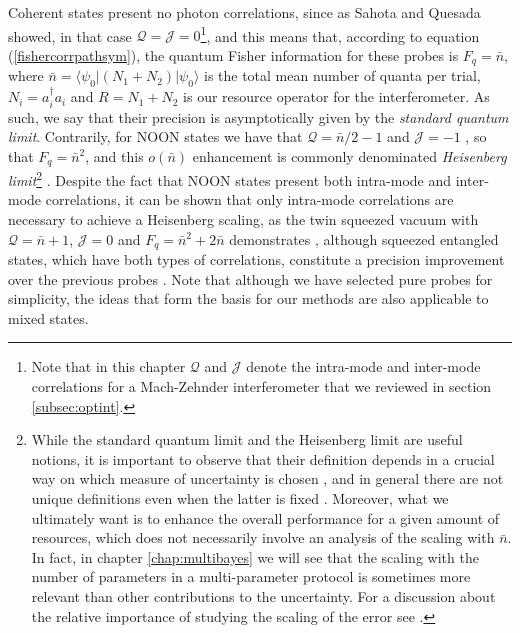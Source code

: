 Coherent states present no photon correlations, since as Sahota and Quesada \cite{sahota2015} showed, in that case $\mathcal{Q} = \mathcal{J} = 0$\footnote{Note that in this chapter $\mathcal{Q}$ and $\mathcal{J}$ denote the intra-mode and inter-mode correlations for a Mach-Zehnder interferometer that we reviewed in section \ref{subsec:optint}.}, and this means that, according to equation (\ref{fishercorrpathsym}), the quantum Fisher information for these probes is $F_q = \bar{n}$, where $\bar{n} = \langle \psi_0 |(N_1 + N_2)| \psi_0\rangle$ is the total mean number of quanta per trial, $N_i = a_i^\dagger a_i$ and $R = N_1 + N_2$ is our resource operator for the interferometer. As such, we say that their precision is asymptotically given by the \emph{standard quantum limit}. Contrarily, for NOON states we have that $\mathcal{Q} = \bar{n}/2-1$ and $\mathcal{J} = -1$ \cite{sahota2015}, so that $F_q = \bar{n}^2$, and this $o(\bar{n})$ enhancement is commonly denominated \emph{Heisenberg limit}\footnote{While the standard quantum limit and the Heisenberg limit are useful notions, it is important to observe that their definition depends in a crucial way on which measure of uncertainty is chosen \cite{li2018, pezze2015, rafal2015}, and in general there are not unique definitions even when the latter is fixed \cite{braun2018}. Moreover, what we ultimately want is to enhance the overall performance for a given amount of resources, which does not necessarily involve an analysis of the scaling with $\bar{n}$. In fact, in chapter \ref{chap:multibayes} we will see that the scaling with the number of parameters in a multi-parameter protocol is sometimes more relevant than other contributions to the uncertainty. For a discussion about the relative importance of studying the scaling of the error see \cite{PaulProctor2016, braun2018}.} \cite{dowling2008}. Despite the fact that NOON states present both intra-mode and inter-mode correlations, it can be shown that only intra-mode correlations are necessary to achieve a Heisenberg scaling, as the twin squeezed vacuum with $\mathcal{Q} = \bar{n} + 1$, $\mathcal{J} = 0$ and $F_q = \bar{n}^2 + 2\bar{n}$ demonstrates \cite{rafal2015, sahota2015}, although squeezed entangled states, which have both types of correlations, constitute a precision improvement over the previous probes \cite{PaulProctor2016}. Note that although we have selected pure probes for simplicity, the ideas that form the basis for our methods are also applicable to mixed states.

